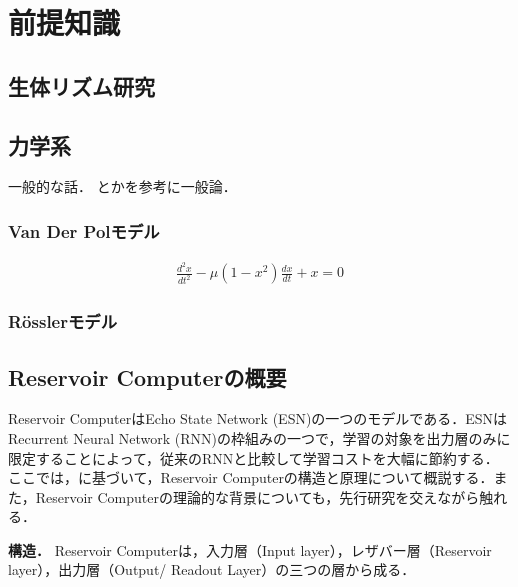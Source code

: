 \chapter{前提知識}

\section{生体リズム研究}

\cite{koriAcceleratingRecoveryJet2017}

\cite{yamaguchiMiceGeneticallyDeficient2013a}

\section{力学系}
一般的な話．
\cite{strogatz2018nonlinear}とかを参考に一般論．


\subsection{Van Der Polモデル}

\begin{align}
    \frac{d^2 x}{d t^2}-\mu\left(1-x^2\right) \frac{d x}{d t}+x=0
\end{align}



\subsection{Rösslerモデル}
\clearpage
\section{Reservoir Computerの概要}

Reservoir ComputerはEcho State Network (ESN)の一つのモデルである．ESNはRecurrent Neural Network (RNN)の枠組みの一つで，学習の対象を出力層のみに限定することによって，従来のRNNと比較して学習コストを大幅に節約する．
ここでは，\cite{bolltExplainingSurprisingSuccess2021}に基づいて，Reservoir Computerの構造と原理について概説する．また，Reservoir Computerの理論的な背景についても，先行研究を交えながら触れる．

\textbf{構造．}
Reservoir Computerは，入力層（Input layer），レザバー層（Reservoir layer），出力層（Output/ Readout Layer）の三つの層から成る．


